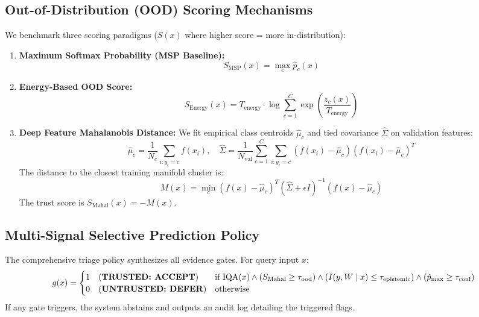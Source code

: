\documentclass[11pt,a4paper]{article}
\begin{document}
\subsection{Out-of-Distribution (OOD) Scoring Mechanisms}
We benchmark three scoring paradigms ($S(x)$ where higher score = more in-distribution):
\begin{enumerate}[leftmargin=*]
    \item \textbf{Maximum Softmax Probability (MSP Baseline):}
    \begin{equation}
        S_{\text{MSP}}(x) = \max_c \hat{p}_c(x)
    \end{equation}
    \item \textbf{Energy-Based OOD Score:}
    \begin{equation}
        S_{\text{Energy}}(x) = T_{\text{energy}} \cdot \log \sum_{c=1}^C \exp\left( \frac{z_c(x)}{T_{\text{energy}}} \right)
    \end{equation}
    \item \textbf{Deep Feature Mahalanobis Distance:}
    We fit empirical class centroids $\hat{\mu}_c$ and tied covariance $\hat{\Sigma}$ on validation features:
    \begin{equation}
        \hat{\mu}_c = \frac{1}{N_c} \sum_{i: y_i = c} f(x_i), \quad \hat{\Sigma} = \frac{1}{N_{\text{val}}} \sum_{c=1}^C \sum_{i: y_i = c} (f(x_i) - \hat{\mu}_c)(f(x_i) - \hat{\mu}_c)^T
    \end{equation}
    The distance to the closest training manifold cluster is:
    \begin{equation}
        M(x) = \min_c \left( f(x) - \hat{\mu}_c \right)^T \left(\hat{\Sigma} + \epsilon I\right)^{-1} \left( f(x) - \hat{\mu}_c \right)
    \end{equation}
    The trust score is $S_{\text{Mahal}}(x) = -M(x)$.
\end{enumerate}

\subsection{Multi-Signal Selective Prediction Policy}
The comprehensive triage policy synthesizes all evidence gates. For query input $x$:
\begin{equation}
    g(x) = \begin{cases}
        1 \quad (\text{\textbf{TRUSTED: ACCEPT}}) & \text{if } \text{IQA}(x) \land (S_{\text{Mahal}} \ge \tau_{\text{ood}}) \land (I(y, W \mid x) \le \tau_{\text{epistemic}}) \land (\hat{p}_{\max} \ge \tau_{\text{conf}}) \\
        0 \quad (\text{\textbf{UNTRUSTED: DEFER}}) & \text{otherwise}
    \end{cases}
\end{equation}
If any gate triggers, the system abstains and outputs an audit log detailing the triggered flags.
\end{document}
